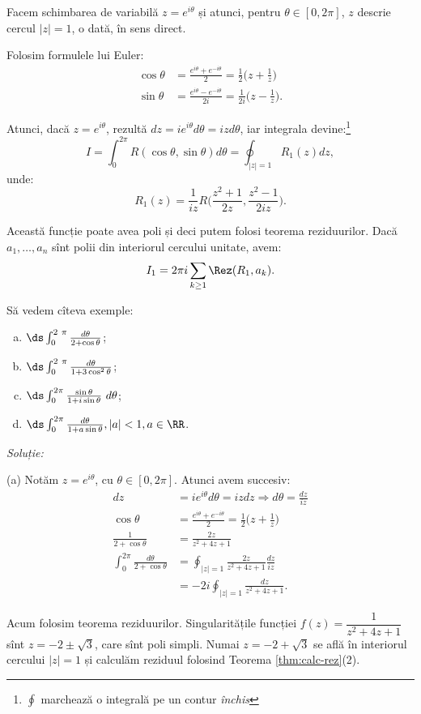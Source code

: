 Facem schimbarea de variabilă $ z = e^{i\theta} $ și atunci, pentru $ \theta \in [0, 2\pi] $,
$ z $ descrie cercul $ |z| = 1 $, o dată, în sens direct.

Folosim formulele lui Euler:
\begin{align*}
  \cos \theta &= \frac{e^{i\theta} + e^{-i\theta}}{2} = \frac{1}{2} \Big( z + \frac{1}{z} \Big) \\
  \sin \theta &= \frac{e^{i\theta} - e^{-i\theta}}{2i} = \frac{1}{2i} \Big( z - \frac{1}{z} \Big).
\end{align*}

Atunci, dacă $ z = e^{i\theta} $, rezultă $ dz = ie^{i\theta} d\theta = izd\theta $,
iar integrala devine:\footnote{$\oint$ marchează o integrală pe un contur \emph{închis}}
\[
  I = \int_0^{2 \pi} R(\cos \theta, \sin \theta) d\theta = \oint_{|z| = 1} R_1(z) dz,
\]
unde:
\[
  R_1(z) = \frac{1}{iz} R\Big( \frac{z^2 + 1}{2z}, \frac{z^2 - 1}{2iz} \Big).
\]

Această funcție poate avea poli și deci putem folosi teorema reziduurilor. Dacă
$ a_1, \dots, a_n $ sînt polii din interiorul cercului unitate, avem:
\[
  I_1 = 2 \pi i \sum_{k \geq 1} \Rez(R_1, a_k).
\]

\vspace{1cm}

Să vedem cîteva exemple:
\begin{enumerate}[(a)]
\item $ \ds\int_0^{2 \pi} \frac{d\theta}{2 + \cos \theta} $;
\item $ \ds\int_0^{2 \pi} \frac{d\theta}{1 + 3 \cos^2 \theta} $;
\item $ \ds\int_0^{2 \pi} \frac{\sin \theta}{1 + i \sin \theta} d\theta $;
\item $ \ds\int_0^{2 \pi} \frac{d\theta}{1 + a \sin \theta}, |a| < 1, a \in \RR $.
\end{enumerate}

\emph{Soluție:}

(a) Notăm $ z = e^{i\theta} $, cu $ \theta \in [0, 2\pi] $. Atunci avem succesiv:
\begin{align*}
  dz &= ie^{i\theta} d\theta = izdz \Rightarrow d\theta = \frac{dz}{iz} \\
  \cos \theta &= \frac{e^{i\theta} + e^{-i\theta}}{2} = \frac{1}{2} \Big( z + \frac{1}{z} \Big) \\
  \frac{1}{2 + \cos \theta} &= \frac{2z}{z^2 + 4z + 1} \\
  \int_0^{2 \pi} \frac{d\theta}{2 + \cos \theta} &= \oint_{|z| = 1} \frac{2z}{z^2 + 4z + 1} \frac{dz}{iz} \\
     &= -2i \oint_{|z| = 1} \frac{dz}{z^2 + 4z + 1}.
\end{align*}

Acum folosim teorema reziduurilor. Singularitățile funcției $ f(z) = \dfrac{1}{z^2 + 4z + 1} $
sînt $ z = -2 \pm \sqrt{3} $, care sînt poli simpli. Numai $ z = -2 + \sqrt{3} $ se află
în interiorul cercului $ |z| = 1 $ și calculăm reziduul folosind
Teorema \ref{thm:calc-rez}(2).


